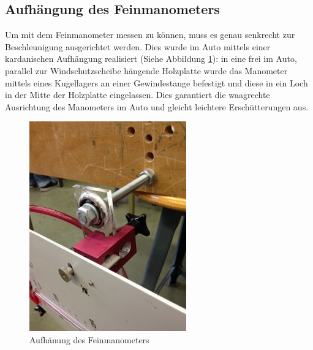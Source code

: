 \subsection{Aufhängung des Feinmanometers}
Um mit dem Feinmanometer messen zu können, muss es genau senkrecht zur Beschleunigung ausgerichtet werden. Dies wurde im Auto mittels einer kardanischen Aufhängung realisiert (Siehe Abbildung \ref{aufhängung}): in eine frei im Auto, parallel zur Windschutzscheibe hängende Holzplatte wurde das Manometer mittels eines Kugellagers an einer Gewindestange befestigt und diese in ein Loch in der Mitte der Holzplatte eingelassen. Dies garantiert die waagrechte Ausrichtung des Manometers im Auto und gleicht leichtere Erschütterungen aus. 


\begin{figure}
\centering
	\includegraphics[width=.5\textwidth]{images/aufhaengung.JPG}
	\caption{Aufhänung des Feinmanometers}
	\label{aufhängung}
\end{figure}